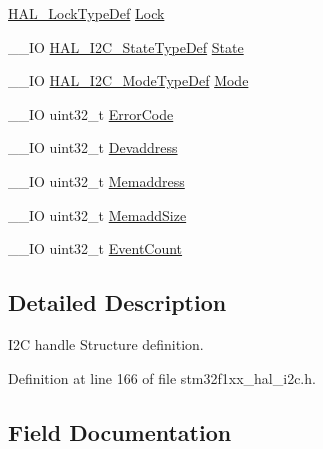 \begin{DoxyCompactItemize}
\hyperlink{stm32f1xx__hal__def_8h_ab367482e943333a1299294eadaad284b}{H\+A\+L\+\_\+\+Lock\+Type\+Def} \hyperlink{struct_i2_c___handle_type_def_ad4cf225029dbefe8d3fe660c33b8bb6b}{Lock}
\item 
\+\_\+\+\_\+\+IO \hyperlink{group___i2_c___exported___types_gaef355af8eab251ae2a19ee164ad81c37}{H\+A\+L\+\_\+\+I2\+C\+\_\+\+State\+Type\+Def} \hyperlink{struct_i2_c___handle_type_def_a48237f31888af06f6c25dead5438f5a7}{State}
\item 
\+\_\+\+\_\+\+IO \hyperlink{group___i2_c___exported___types_gabcbb7b844f2ffd63c4e530c117882062}{H\+A\+L\+\_\+\+I2\+C\+\_\+\+Mode\+Type\+Def} \hyperlink{struct_i2_c___handle_type_def_ac25cb640453370e3b2526799dc24eb5a}{Mode}
\item 
\+\_\+\+\_\+\+IO uint32\+\_\+t \hyperlink{struct_i2_c___handle_type_def_a123c5063e6a3b1901b2fbe5f88c53a7e}{Error\+Code}
\item 
\+\_\+\+\_\+\+IO uint32\+\_\+t \hyperlink{struct_i2_c___handle_type_def_ad6bcf76f2ccfe535724014ef07eae04b}{Devaddress}
\item 
\+\_\+\+\_\+\+IO uint32\+\_\+t \hyperlink{struct_i2_c___handle_type_def_a009bdd1b89c6ca994760617de151645d}{Memaddress}
\item 
\+\_\+\+\_\+\+IO uint32\+\_\+t \hyperlink{struct_i2_c___handle_type_def_a4c670e27912a66ef89546d7006d1b06b}{Memadd\+Size}
\item 
\+\_\+\+\_\+\+IO uint32\+\_\+t \hyperlink{struct_i2_c___handle_type_def_a5b9ab6922825ed4ab1bfeef04f18b90a}{Event\+Count}
\end{DoxyCompactItemize}


\subsection{Detailed Description}
I2C handle Structure definition. 

Definition at line 166 of file stm32f1xx\+\_\+hal\+\_\+i2c.\+h.



\subsection{Field Documentation}
\mbox{\label{struct_i2_c___handle_type_def_ad6bcf76f2ccfe535724014ef07eae04b}} 
